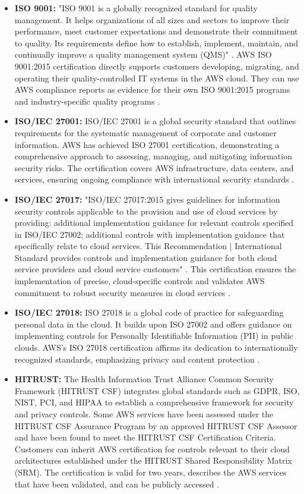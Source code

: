 \begin{itemize}
    \item \textbf{ISO 9001:} "ISO 9001 is a globally recognized standard for quality management. It helps organizations of all sizes and sectors to improve their performance, meet customer expectations and demonstrate their commitment to quality. Its requirements define how to establish, implement, maintain, and continually improve a quality management system (QMS)" \cite{ISO9001}. AWS ISO 9001:2015 certification directly supports customers developing, migrating, and operating their quality-controlled IT systems in the AWS cloud. They can use AWS compliance reports as evidence for their own ISO 9001:2015 programs and industry-specific quality programs \cite{AWSISO9001}.
    \item \textbf{ISO/IEC 27001:} ISO/IEC 27001 is a global security standard that outlines requirements for the systematic management of corporate and customer information. AWS has achieved ISO 27001 certification, demonstrating a comprehensive approach to assessing, managing, and mitigating information security risks. The certification covers AWS infrastructure, data centers, and services, ensuring ongoing compliance with international security standards \cite{ISOIEC27001}.
    \item \textbf{ISO/IEC 27017:} "ISO/IEC 27017:2015 gives guidelines for information security controls applicable to the provision and use of cloud services by providing: additional implementation guidance for relevant controls specified in ISO/IEC 27002; additional controls with implementation guidance that specifically relate to cloud services. This Recommendation | International Standard provides controls and implementation guidance for both cloud service providers and cloud service customers" \cite{ISOIEC27017}. This certification ensures the implementation of precise, cloud-specific controls and validates AWS commitment to robust security measures in cloud services \cite{AWSISOIEC27017}.
    \item \textbf{ISO/IEC 27018:} ISO 27018 is a global code of practice for safeguarding personal data in the cloud. It builds upon ISO 27002 and offers guidance on implementing controls for Personally Identifiable Information (PII) in public clouds. AWS's ISO 27018 certification affirms its dedication to internationally recognized standards, emphasizing privacy and content protection \cite{AWSISOIEC27018}.
    \item \textbf{HITRUST:} The Health Information Trust Alliance Common Security Framework (HITRUST CSF) integrates global standards such as GDPR, ISO, NIST, PCI, and HIPAA to establish a comprehensive framework for security and privacy controls. Some AWS services have been assessed under the HITRUST CSF Assurance Program by an approved HITRUST CSF Assessor and have been found to meet the HITRUST CSF Certification Criteria.  Customers can inherit AWS certification for controls relevant to their cloud architectures established under the HITRUST Shared Responsibility Matrix (SRM). The certification is valid for two years, describes the AWS services that have been validated, and can be publicly accessed \cite{AWSHITRUSTCSF}.

\end{itemize}

